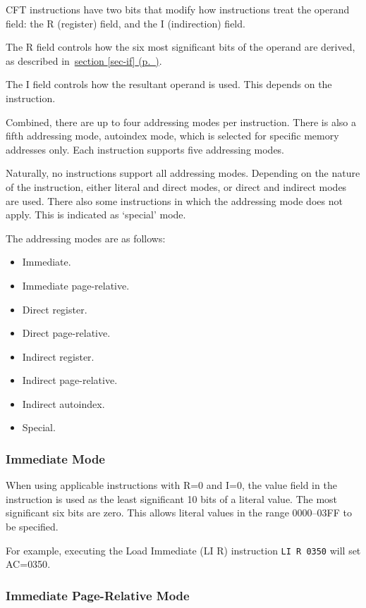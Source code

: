 \documentclass[11pt,a4paper,twocolumns]{article}
\newcommand{\cf}[2][section]{\hyperref[#2]{#1 \ref*{#2} (p.~\pageref*{#2})}}
\newcommand\hex[1]{\textsf{#1}}
\newcommand\register[1]{\textsf{#1}}
\newcommand\A{\register{AC}}
\begin{document}
CFT instructions have two bits that modify how instructions treat the
operand field: the R (register) field, and the I (indirection)
field.

The R field controls how the six most significant bits of the operand
are derived, as described in~\cf{sec-if}.

The I field controls how the resultant operand is used. This depends
on the instruction.

Combined, there are up to four addressing modes per instruction. There
is also a fifth addressing mode, autoindex mode, which is selected for
specific memory addresses only. Each instruction supports five
addressing modes. 

Naturally, no instructions support all addressing modes. Depending on
the nature of the instruction, either literal and direct modes, or
direct and indirect modes are used. There also some instructions in
which the addressing mode does not apply. This is indicated as
‘special’ mode.

The addressing modes are as follows:

\begin{itemize}
  \item Immediate.
  \item Immediate page-relative.
  \item Direct register.
  \item Direct page-relative.
  \item Indirect register.
  \item Indirect page-relative.
  \item Indirect autoindex.
  \item Special.
\end{itemize}

\subsubsection{Immediate Mode}

When using applicable instructions with R=0 and I=0, the value field
in the instruction is used as the least significant 10 bits of a
literal value. The most significant six bits are zero. This allows
literal values in the range \hex{0000}–\hex{03FF} to be specified.

For example, executing the Load Immediate (LI R) instruction {\tt LI R
  0350} will set \A=\hex{0350}.

\subsubsection{Immediate Page-Relative Mode}
\end{document}
